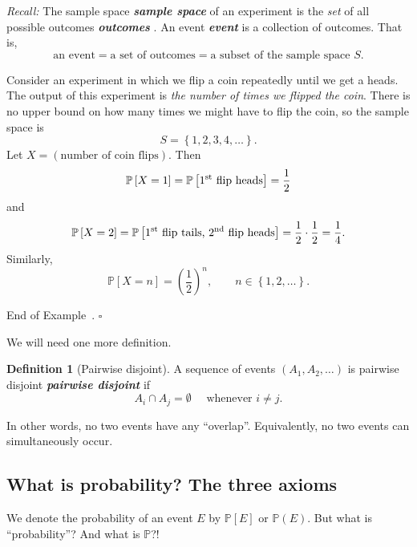 \documentclass[10pt]{article}
\theoremstyle{definition}
\newtheorem{definition}[theorem]{Definition}
\newtheorem{example}[theorem]{Example}
\renewenvironment{example}
{\begin{oldexample}}
  {\par\smallskip\hfill   End of Example~\theexample. $\square$    \par\end{oldexample}}
\newcommand{\1}[1]{\textbf{1}_{\left[#1\right]}} %
\def\P{\mathbb{P}} %
\DeclareRobustCommand{\demph}[1]{%
  \ifmmode
  {\color{Blue}#1}%
  \else
  {\color{Blue}\bfseries\slshape #1}%
  \fi
}
\begin{document}
\textit{Recall:} The \demph{sample space} of an experiment is the \textit{set} of all possible
\demph{outcomes}. An \demph{event} is a collection of outcomes. That is,
\begin{equation*}
  \text{an event} = \text{a set of outcomes} = \text{a subset of the sample space $S$.}
\end{equation*}





\begin{example}[Repeated coin flipping]
  \label{ex:repeated-coin-flipping}
  Consider an experiment in which we flip a coin repeatedly until we get a
  heads. The output of this experiment is \textit{the number of times we
    flipped the coin}. There is no upper bound on how many times we might have
  to flip the coin, so the sample space is
  \begin{equation*}
    S = \left\{1,2,3,4,\ldots\right\}.
  \end{equation*}
  Let $X = (\text{number of coin flips})$. Then
  \begin{equation*}
    \P\left[X = 1 \right] = \P\left[\text{$1^{\rm st}$ flip heads} \right] = \frac{1}{2}
  \end{equation*}
  and
  \begin{equation*}
    \P\left[X = 2 \right] 
    = \P\left[\text{$1^{\rm st}$ flip tails, $2^{\rm nd}$ flip heads} \right] 
    = \frac{1}{2}\cdot \frac{1}{2}
    = \frac{1}{4}.
  \end{equation*}
  Similarly, 
  \begin{equation}\label{eq:1}
    \P\left[X=n \right]= \left( \frac{1}{2} \right)^{n}, \qquad n\in \left\{1,2,\ldots\right\}.
  \end{equation}
\end{example}


We will need one more definition.

\begin{definition}[Pairwise disjoint]
  A sequence of events $(A_{1},A_{2},\ldots)$ is \demph{pairwise
    disjoint} if
  \begin{equation*}
    A_{i}\cap A_{j} = \emptyset \quad \text{ whenever }i\neq j.
  \end{equation*}
\end{definition}
In other words, no two events have any ``overlap''. Equivalently, no two
events can simultaneously occur.

\subsection{What is probability? The three axioms}
We denote the probability of an event $E$ by $\P\left[E \right]$ or
$\P\left( E\right)$. But what is ``probability''? And what is $\P$?!
\end{document}
